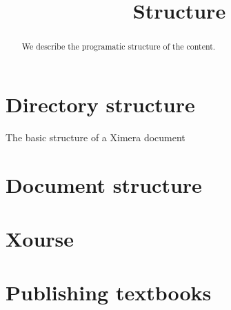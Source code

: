 \documentclass{ximera}
\title{Structure}
\begin{document}
\begin{abstract}
  We describe the programatic structure of the content.
\end{abstract}
\maketitle

\section{Directory structure}

The basic structure of a Ximera document 


\section{Document structure}


\section{Xourse}


\section{Publishing textbooks}
\end{document}
